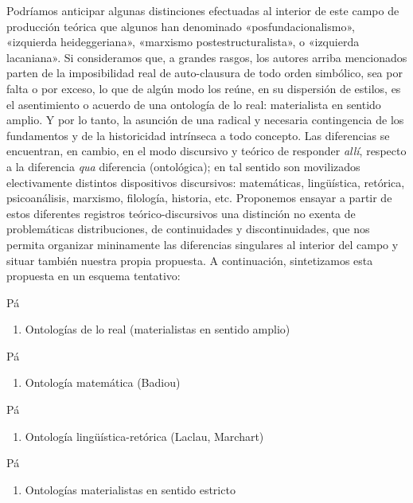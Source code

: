 Podríamos anticipar algunas distinciones efectuadas al interior de este campo de producción teórica que algunos han denominado «posfundacionalismo», «izquierda heideggeriana», «marxismo postestructuralista», o «izquierda lacaniana». Si consideramos que, a grandes rasgos, los autores arriba mencionados parten de la imposibilidad real de auto-clausura de todo orden simbólico, sea por falta o por exceso, lo que de algún modo los reúne, en su dispersión de estilos, es el asentimiento o acuerdo de una ontología de lo real: materialista en sentido amplio. Y por lo tanto, la asunción de una radical y necesaria contingencia de los fundamentos y de la historicidad intrínseca a todo concepto. Las diferencias se encuentran, en cambio, en el modo discursivo y teórico de responder \emph{allí}, respecto a la diferencia \emph{qua} diferencia (ontológica); en tal sentido son movilizados electivamente distintos dispositivos discursivos: matemáticas, lingüística, retórica, psicoanálisis, marxismo, filología, historia, etc. Proponemos ensayar a partir de estos diferentes registros teórico-discursivos una distinción no exenta de problemáticas distribuciones, de continuidades y discontinuidades, que nos permita organizar mininamente las diferencias singulares al interior del campo y situar también nuestra propia propuesta. A continuación, sintetizamos esta propuesta en un esquema tentativo:

Pá

\begin{enumerate}
\def\labelenumi{\arabic{enumi}.}
\item
  Ontologías de lo real (materialistas en sentido amplio)
\end{enumerate}

Pá

\begin{enumerate}
\def\labelenumi{\arabic{enumi}.}
\item
  Ontología matemática (Badiou)
\end{enumerate}

Pá

\begin{enumerate}
\def\labelenumi{\arabic{enumi}.}
\item
  Ontología lingüística-retórica (Laclau, Marchart)
\end{enumerate}

Pá

\begin{enumerate}
\def\labelenumi{\arabic{enumi}.}
\item
  Ontologías materialistas en sentido estricto
\end{enumerate}

